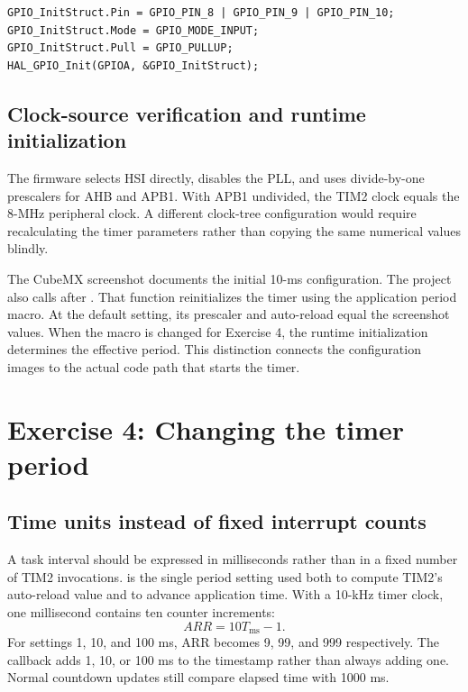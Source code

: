 \documentclass[a4paper]{article}
\newcommand{\code}[1]{\texttt{\detokenize{#1}}}
\newcommand{\topic}[1]{\subsection{#1}}
\begin{document}
\par\noindent\begin{minipage}{\linewidth}
\begin{lstlisting}[caption={Essential input pin configuration}]
GPIO_InitStruct.Pin = GPIO_PIN_8 | GPIO_PIN_9 | GPIO_PIN_10;
GPIO_InitStruct.Mode = GPIO_MODE_INPUT;
GPIO_InitStruct.Pull = GPIO_PULLUP;
HAL_GPIO_Init(GPIOA, &GPIO_InitStruct);
\end{lstlisting}
\end{minipage}\par

\topic{Clock-source verification and runtime initialization}

The firmware selects HSI directly, disables the PLL, and uses divide-by-one
prescalers for AHB and APB1. With APB1 undivided, the TIM2 clock equals the
8-MHz peripheral clock. A different clock-tree configuration would require
recalculating the timer parameters rather than copying the same numerical
values blindly\cite{rm0008}.

The CubeMX screenshot documents the initial 10-ms configuration. The project
also calls \code{timer_start()} after \code{MX_TIM2_Init()}. That function
reinitializes the timer using the application period macro. At the default
setting, its prescaler and auto-reload equal the screenshot values. When the
macro is changed for Exercise 4, the runtime initialization determines the
effective period. This distinction connects the configuration images to the
actual code path that starts the timer.


\clearpage
\section{Exercise 4: Changing the timer period}

\topic{Time units instead of fixed interrupt counts}
A task interval should be expressed in milliseconds rather than in a fixed
number of TIM2 invocations. \code{TIMER_CYCLE_MS} is the single period setting
used both to compute TIM2's auto-reload value and to advance application time.
With a 10-kHz timer clock, one millisecond contains ten counter increments:
\[
ARR=10T_{\mathrm{ms}}-1.
\]
For settings 1, 10, and 100 ms, ARR becomes 9, 99, and 999 respectively.
The callback adds 1, 10, or 100 ms to the timestamp rather than always adding
one. Normal countdown updates still compare elapsed time with 1000 ms.
\end{document}
